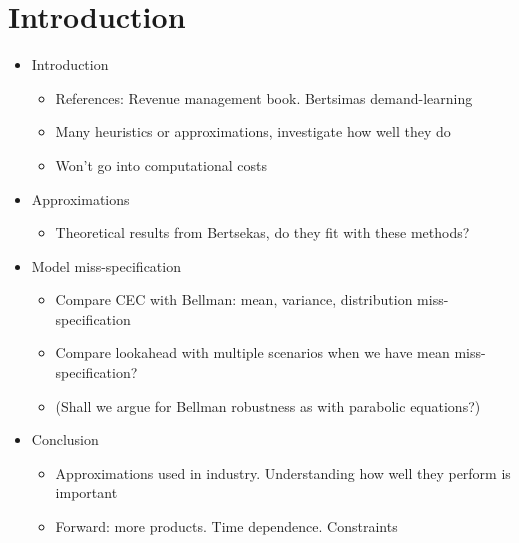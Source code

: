 \documentclass[main.tex]{subfiles}
\begin{document}
\listoftodos

\section{Introduction}

\begin{itemize}
\item Introduction
  \begin{itemize}
  \item References: Revenue management book. Bertsimas demand-learning
  \item Many heuristics or approximations, investigate how well they
    do
  \item Won't go into computational costs
  \end{itemize}
\item Approximations
  \begin{itemize}
  \item Theoretical results from Bertsekas, do they fit with these methods?
  \end{itemize}
\item Model miss-specification
  \begin{itemize}
  \item Compare CEC with Bellman: mean, variance, distribution
    miss-specification
  \item Compare lookahead with multiple scenarios when we have mean miss-specification?
  \item (Shall we argue for Bellman robustness as with parabolic equations?)
  \end{itemize}
\item Conclusion
  \begin{itemize}
  \item Approximations used in industry. Understanding how well they
    perform is important
  \item Forward: more products. Time dependence. Constraints
  \end{itemize}
\end{itemize}
\end{document}
